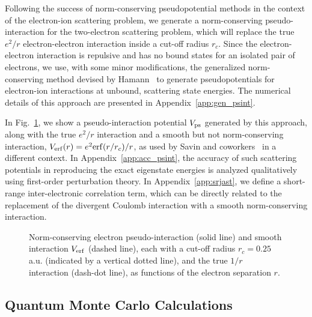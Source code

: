 Following the success of norm-conserving pseudopotential methods 
in the context of the electron-ion scattering problem, we generate 
a norm-conserving pseudo-interaction for the two-electron scattering 
problem, which will replace the true 
$e^2/r$ electron-electron interaction inside a cut-off radius $r_c$.
Since the electron-electron interaction is repulsive and has no bound 
states for an isolated pair of electrons, we use, with some minor
modifications, the generalized norm-conserving method devised by 
Hamann~\cite{Hamann:gncpp} to generate pseudopotentials for
electron-ion interactions at unbound, scattering state energies.
The numerical details of this approach are presented in 
Appendix~\ref{app:gen_psint}.

In Fig.~\ref{fig:interxns}, we show a pseudo-interaction potential
$V_{\rm ps}$ generated by this approach, along with the true $e^2/r$ 
interaction and a smooth but not norm-conserving interaction, 
$V_{\rm erf}(r) = e^2{\rm erf}(r/r_c)/r$,
as used by Savin and coworkers~\cite{Savin:erf} in a different
context.
In Appendix~\ref{app:acc_psint}, the accuracy of such scattering 
potentials in reproducing the exact eigenstate energies is analyzed 
qualitatively using first-order perturbation theory. 
In Appendix~\ref{app:srjast}, we define a short-range inter-electronic 
correlation term, which can be directly related to the replacement 
of the divergent Coulomb interaction with a smooth norm-conserving 
interaction. 

%
%

\begin{figure}[!tb]
\begin{center}
  \leavevmode
  \vspace{1.0cm}
  \vspace{0.5cm}
  \caption{
    Norm-conserving electron pseudo-interaction (solid line)
    and smooth interaction $V_{\rm erf}$ (dashed line),
    each with a cut-off radius $r_c = 0.25$ a.u. (indicated by a vertical dotted line),
    and the true $1/r$ interaction (dash-dot line),
    as functions of the electron separation $r$.
  }
  \label{fig:interxns}
\end{center}
\end{figure}


\subsection{Quantum Monte Carlo Calculations}


